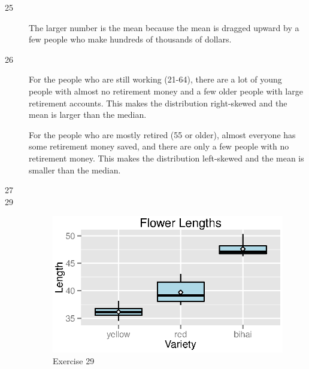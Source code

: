 \documentclass{exam}
\begin{document}
  \ifprintanswers
    \begin{description}
      \item[25] The larger number is the mean because the mean is dragged upward by a few
        people who make hundreds of thousands of dollars.

      \item[26] 
        For the people who are still working (21-64), there are a lot of young people with
        almost no retirement money and a few older people with large retirement accounts.
        This makes the distribution right-skewed and the mean is larger than the median.

        For the people who are mostly retired (55 or older), almost everyone has some
        retirement money saved, and there are only a few people with no retirement money.
        This makes the distribution left-skewed and the mean is smaller than the median.

      \item[27] 

      \item[29]
        \begin{figure}[H]
          \centering
          \includegraphics{figures/ex29.eps}
          \caption{Exercise 29}
        \end{figure}


\end{description}
\end{document}
